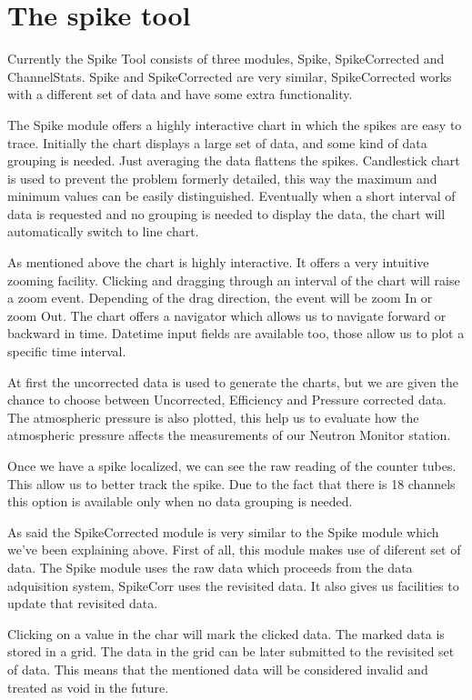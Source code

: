 \documentclass[a4paper]{jpconf}
\begin{document}
\section{The spike tool}

Currently the Spike Tool consists of three modules, Spike, SpikeCorrected and
ChannelStats. Spike and SpikeCorrected are very similar, SpikeCorrected works
with a different set of data and have some extra functionality.

The Spike module offers a highly interactive chart in which the spikes are easy
to trace. Initially the chart displays a large set of data, and some kind of
data grouping is needed. Just averaging the data flattens the spikes.
Candlestick chart is used to prevent the problem formerly detailed, this way the
maximum and minimum values can be easily distinguished. Eventually when a short interval
of data is requested and no grouping is needed to display the data, the chart
will automatically switch to line chart.

As mentioned above the chart is highly interactive. It offers a very intuitive
zooming facility. Clicking and dragging through an interval of the chart will
raise a zoom event. Depending of the drag direction, the event will be zoom In
or zoom Out. The chart offers a navigator which allows us to navigate forward or
backward in time. Datetime input fields are available too, those allow us to
plot a specific time interval.

At first the uncorrected data is used to generate the charts, but we are given
the chance to choose between Uncorrected, Efficiency and Pressure corrected
data. The atmospheric pressure is also plotted, this help us to evaluate how the
atmospheric pressure affects the measurements of our Neutron Monitor station.

Once we have a spike localized, we can see the raw reading of the counter tubes.
This allow us to better track the spike. Due to the fact that there is 18
channels this option is available only when no data grouping is needed.

As said the SpikeCorrected module is very similar to the Spike module which
we've been explaining above. First of all, this module makes use of diferent set
of data. The Spike module uses the raw data which proceeds from the data
adquisition system, SpikeCorr uses the revisited data. It also gives us
facilities to update that revisited data.

Clicking on a value in the char will mark the clicked data. The marked data is
stored in a grid. The data in the grid can be later submitted to the revisited
set of data. This means that the mentioned data will be considered invalid and
treated as void in the future.
\end{document}
